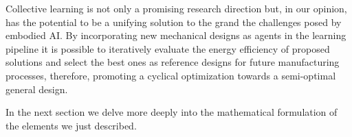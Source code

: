 Collective learning is not only a promising research direction but, in our opinion, has the potential to be a unifying solution to the grand the challenges posed by embodied AI. By incorporating new mechanical designs as agents in the learning pipeline it is possible to iteratively evaluate the energy efficiency of proposed solutions and select the best ones as reference designs for future manufacturing processes, therefore, promoting a cyclical optimization towards a semi-optimal general design.

In the next section we delve more deeply into the mathematical formulation of the elements we just described. 